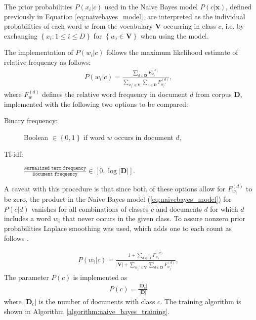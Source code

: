 
The prior probabilities $P(x_i\vert c)$ used in the Naive Bayes model $P(c\vert\mathbf{x})$, defined previously in Equation \ref{eq:naivebayes_model}, are interpreted as the individual probabilities of each word $w$ from the vocabulary $\mathbf{V}$ occurring in class $c$, i.e. by exchanging $\left\{x_i : 1 \le i \le D\right\}$ for $\left\{w_i \in \mathbf{V}\right\}$ when using the model.

The implementation of $P(w_i\vert c)$ follows the maximum likelihood estimate of relative frequency as follows:
\begin{align}
P(w_i\vert c) =
\frac
	{
		\sum_{d \in \mathbf{D}} F_{w_i}^{(d)}
	}
	{
		\sum_{w_j' \in \mathbf{V}} \sum_{d \in \mathbf{D}}  F_{w_j'}^{(d)}
	},
\end{align}
where $F_w^{(d)}$ defines the relative word frequency in document $d$ from corpus $\mathbf{D}$, implemented with the following two options to be compared:
\begin{description}
  \item[Binary frequency:] Boolean $\in \left\{0,1\right\}$ if word $w$ occurs in document $d$,
  \item[Tf-idf:] $\frac{\texttt{Normalized term frequency}}{\texttt{Document frequency}} \in \left[0, \log \left\vert \mathbf{D}\right\vert\right]$.
\end{description}
A caveat with this procedure is that since both of these options allow for $F_{w_i}^{(d)}$ to be zero, the product in the Naive Bayes model (\ref{eq:naivebayes_model}) for $P(c\vert d)$ vanishes for all combinations of classes $c$ and documents $d$ for which $d$ includes a word $w_i$ that never occurs in the given class. To assure nonzero prior probabilities Laplace smoothing was used, which adds one to each count as follows \citep{nb_ref}. 

\begin{align}
P(w_i\vert c) =
\frac
	{
		1 + \sum_{d \in \mathbf{D}} F_{w_i}^{(d)}
	}
	{
		\left\vert\mathbf{V}\right\vert + \sum_{w_j' \in \mathbf{V}} \sum_{d \in \mathbf{D}} F_{w_j'}^{(d)}
	},
\end{align}
The parameter $P(c)$ is implemented as
\begin{align}
P(c) = \frac{\left\vert\mathbf{D}_c\right\vert}{\left\vert\mathbf{D}\right\vert}
\end{align}
where $\left\vert\mathbf{D}_c\right\vert$ is the number of documents with class $c$. The training algorithm is shown in Algorithm \ref{algorithm:naive_bayes_training}.

